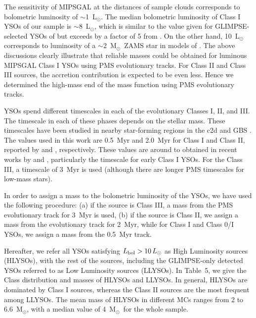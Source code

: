 \documentclass[iop]{emulateapj}
\newcommand{\msun}{M$_{\odot}$}
\newcommand{\lsun}{L$_{\odot}$}
\begin{document}
The sensitivity of MIPSGAL at the distances of sample clouds corresponds 
to bolometric luminosity of $\sim$1~\lsun. The median 
bolometric luminosity of Class I YSOs of our sample is $\sim$8~\lsun, %
which is similar to the value given for GLIMPSE-selected YSOs of \citet{offner+11} 
but exceeds by a factor of 5  from \citet{kennicutt+12}. %
On the other hand, 10~\lsun~ 
corresponds to luminosity of a $\sim$2~\msun ~ZAMS star in 
models of \citet{tognelli+11}. The above discussions clearly illustrate 
that reliable masses could be obtained for luminous MIPSGAL 
Class I YSOs using PMS evolutionary tracks.
For Class II and Class III sources, the accretion contribution is expected
to be even less. Hence we determined the high-mass end of the
mass function using \citet{tognelli+11} PMS evolutionary tracks.

YSOs spend different timescales in each of the evolutionary Classes I, II, 
and III. The timescale in each of these phases depends on the stellar mass.
These timescales have been studied in nearby star-forming regions in the 
c2d and GBS \citep{evans+09,dunham+15}.
The values used in this work are 0.5~Myr and 2.0~Myr for Class I 
and Class II, reported by \citet{kenyon+95} and \citet{evans+09}, respectively. 
{ These values are around to obtained in recent works by \citet{heiderman+15} 
and \citet{dunham+15}, particularly the timescale for early Class I YSOs.}
For the Class III, a timescale of 3~Myr is used (although there are longer 
PMS timescales for low-mass stars). 

In order to assign a mass to the bolometric luminosity of the YSOs, we
have used the following procedure: (a) if the source is Class III, a mass 
from the PMS evolutionary track for 3~Myr is used, (b) if the 
source is Class II, we assign a mass from the evolutionary track for 
2~Myr, while for Class I and Class 0/I YSOs, we assign a mass from the 
0.5~Myr track. 

Hereafter, we refer all YSOs satisfying $L_{\rm bol}>10\,L_{\odot}$
as High Luminosity sources (HLYSOs), with the rest of the sources, including the 
GLIMPSE-only detected YSOs referred to as Low Luminosity sources (LLYSOs). 
In Table~5, we give the Class distribution and masses of HLYSOs and LLYSOs.
In general, HLYSOs are dominated by Class I sources, whereas the Class II
sources are the most frequent among LLYSOs. The mean mass of HLYSOs in different
MCs ranges from 2 to 6.6~\msun, with a median value of 4~\msun\ for the whole sample.
\end{document}
